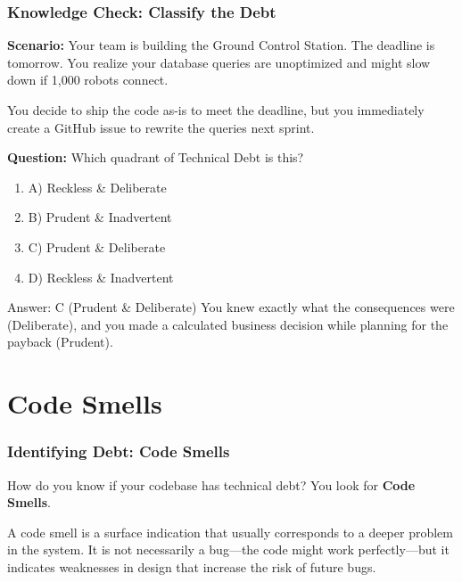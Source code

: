 \documentclass[xcolor=table]{beamer}
\begin{document}
\begin{frame}
    \frametitle{Knowledge Check: Classify the Debt}
    \textbf{Scenario:} 
    Your team is building the Ground Control Station. The deadline is tomorrow. You realize your database queries are unoptimized and might slow down if 1,000 robots connect. 
    
    You decide to ship the code as-is to meet the deadline, but you immediately create a GitHub issue to rewrite the queries next sprint.
    
    \vspace{0.3cm}
    \textbf{Question:} Which quadrant of Technical Debt is this?
    \begin{enumerate}
        \item A) Reckless \& Deliberate
        \item B) Prudent \& Inadvertent
        \item C) Prudent \& Deliberate
        \item D) Reckless \& Inadvertent
    \end{enumerate}
    
    \pause
    \vspace{0.3cm}
    \begin{alertblock}{Answer: C (Prudent \& Deliberate)}
        You knew exactly what the consequences were (Deliberate), and you made a calculated business decision while planning for the payback (Prudent).
    \end{alertblock}
\end{frame}
\section{Code Smells}

\begin{frame}
    \frametitle{Identifying Debt: Code Smells}
    How do you know if your codebase has technical debt? You look for \textbf{Code Smells}.
    
    \vspace{0.3cm}
    A code smell is a surface indication that usually corresponds to a deeper problem in the system. It is not necessarily a bug—the code might work perfectly—but it indicates weaknesses in design that increase the risk of future bugs.
\end{frame}
\end{document}
